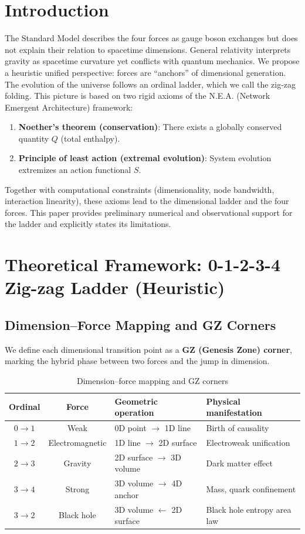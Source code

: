 \documentclass[12pt,a4paper]{article}
\begin{document}
\section{Introduction}
The Standard Model describes the four forces as gauge boson exchanges but does not explain their relation to spacetime dimensions. General relativity interprets gravity as spacetime curvature yet conflicts with quantum mechanics. We propose a heuristic unified perspective: forces are ``anchors'' of dimensional generation. The evolution of the universe follows an ordinal ladder, which we call the zig-zag folding. This picture is based on two rigid axioms of the N.E.A. (Network Emergent Architecture) framework:
\begin{enumerate}
    \item \textbf{Noether's theorem (conservation)}: There exists a globally conserved quantity $Q$ (total enthalpy).
    \item \textbf{Principle of least action (extremal evolution)}: System evolution extremizes an action functional $S$.
\end{enumerate}
Together with computational constraints (dimensionality, node bandwidth, interaction linearity), these axioms lead to the dimensional ladder and the four forces. This paper provides preliminary numerical and observational support for the ladder and explicitly states its limitations.

\section{Theoretical Framework: 0-1-2-3-4 Zig-zag Ladder (Heuristic)}
\subsection{Dimension–Force Mapping and GZ Corners}
We define each dimensional transition point as a \textbf{GZ (Genesis Zone) corner}, marking the hybrid phase between two forces and the jump in dimension.

\begin{table}[H]
\centering
\caption{Dimension–force mapping and GZ corners}
\begin{tabularx}{\textwidth}{c c X X}
\toprule
Ordinal & Force & Geometric operation & Physical manifestation \\
\midrule
$0\to1$ & Weak & 0D point $\to$ 1D line & Birth of causality \\
$1\to2$ & Electromagnetic & 1D line $\to$ 2D surface & Electroweak unification \\
$2\to3$ & Gravity & 2D surface $\to$ 3D volume & Dark matter effect \\
$3\to4$ & Strong & 3D volume $\to$ 4D anchor & Mass, quark confinement \\
$3\to2$ & Black hole & 3D volume $\leftarrow$ 2D surface & Black hole entropy area law \\
\bottomrule
\end{tabularx}
\end{table}
\end{document}
